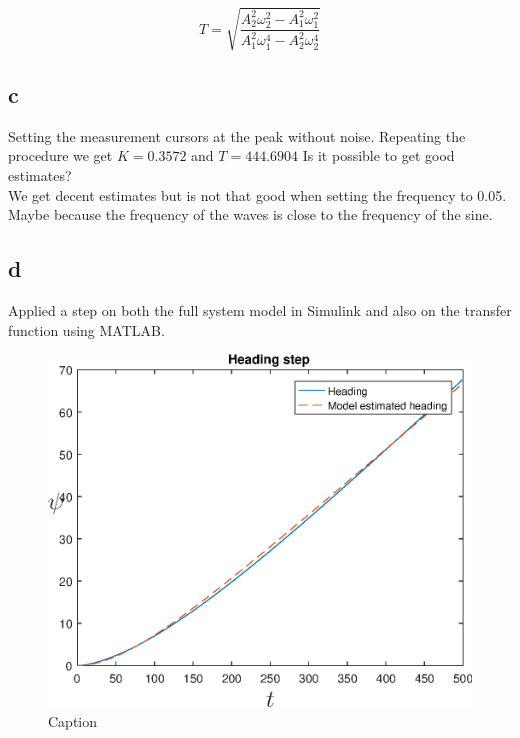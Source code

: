 $$T = \sqrt{\frac{A_2^2\omega_2^2-A_1^2\omega_1^2}{A_1^2\omega_1^4-A_2^2\omega_2^4}}$$

\subsection{c}
Setting the measurement cursors at the peak without noise. 
Repeating the procedure we get $K = 0.3572$ and $T = 444.6904$
Is it possible to get good estimates?\\
We get decent estimates but is not that good when setting the frequency to 0.05. Maybe because the frequency of the waves is close to the frequency of the sine. 
\subsection{d}
Applied a step on both the full system model in Simulink and also on the transfer function using MATLAB. 
\begin{figure}
    \centering
    \includegraphics{figures/plots/p5p1d.eps}
    \caption{Caption\todo{}}
    \label{fig:my_label}
\end{figure}